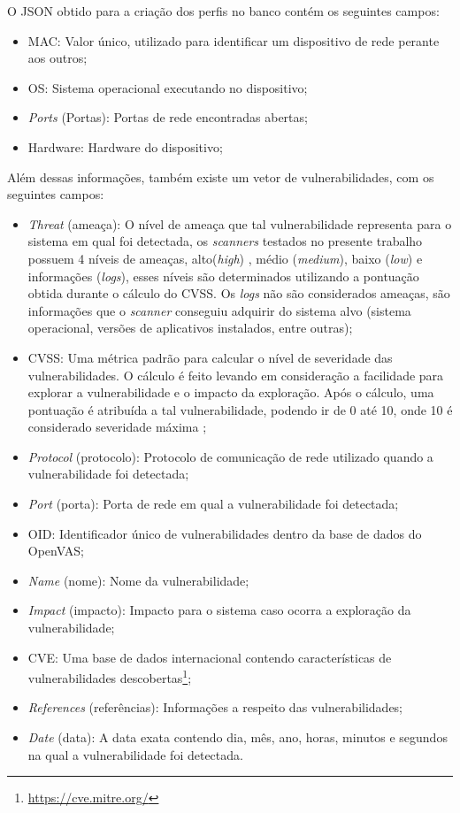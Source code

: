 O \gls{JSON} obtido para a criação dos perfis no banco contém os seguintes campos:
\begin{itemize}
    \item \gls{MAC}: Valor único, utilizado para identificar um dispositivo de rede perante aos outros;
    \item \gls{OS}: Sistema operacional executando no dispositivo;
    \item \textit{Ports} (Portas): Portas de rede encontradas abertas;
    \item Hardware: Hardware do dispositivo;
\end{itemize}
Além dessas informações, também existe um vetor de vulnerabilidades, com os seguintes campos:
\begin{itemize}
    \item \textit{Threat} (ameaça): O nível de ameaça que tal vulnerabilidade representa para o sistema em qual foi detectada, os \textit{scanners} testados no presente trabalho possuem 4 níveis de ameaças,  alto(\textit{high}) , médio (\textit{medium}),  baixo (\textit{low}) e informações  (\textit{logs}), esses níveis são determinados utilizando a pontuação obtida durante o cálculo do \gls{CVSS}.  Os \textit{logs} não são considerados ameaças, são informações que o \textit{scanner} conseguiu adquirir do sistema alvo (sistema operacional, versões de aplicativos instalados, entre outras);
    \item \gls{CVSS}: Uma métrica padrão para calcular o nível de severidade das vulnerabilidades. O cálculo é feito levando em consideração a facilidade para explorar a vulnerabilidade e o impacto da exploração. Após o cálculo, uma pontuação é atribuída a tal vulnerabilidade, podendo ir de 0 até 10, onde 10 é considerado severidade máxima \cite{cvss};
    \item \textit{Protocol} (protocolo): Protocolo de comunicação de rede utilizado quando a vulnerabilidade foi detectada;
    \item \textit{Port} (porta): Porta de rede em qual a vulnerabilidade foi detectada;
    \item OID: Identificador único de vulnerabilidades dentro da base de dados do \gls{OpenVAS};
    \item \textit{Name} (nome): Nome da vulnerabilidade;
    \item \textit{Impact} (impacto): Impacto para o sistema caso ocorra a exploração da vulnerabilidade;
    \item \gls{CVE}: Uma base de dados internacional contendo características de vulnerabilidades descobertas\footnote{\url{https://cve.mitre.org/}};
    \item \textit{References} (referências): Informações a respeito das vulnerabilidades;
    \item \textit{Date} (data): A data exata contendo dia, mês, ano, horas, minutos e segundos na qual a vulnerabilidade foi detectada.
\end{itemize}

